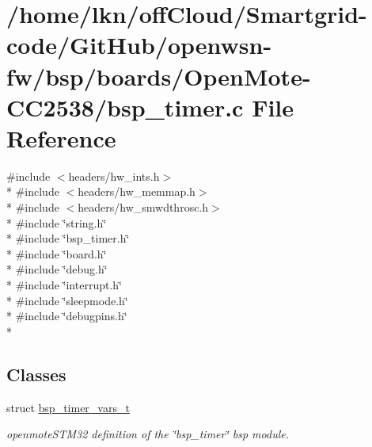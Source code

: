 \hypertarget{_open_mote-_c_c2538_2bsp__timer_8c}{}\section{/home/lkn/off\+Cloud/\+Smartgrid-\/code/\+Git\+Hub/openwsn-\/fw/bsp/boards/\+Open\+Mote-\/\+C\+C2538/bsp\+\_\+timer.c File Reference}
\label{_open_mote-_c_c2538_2bsp__timer_8c}
{\ttfamily \#include $<$headers/hw\+\_\+ints.\+h$>$}\\*
{\ttfamily \#include $<$headers/hw\+\_\+memmap.\+h$>$}\\*
{\ttfamily \#include $<$headers/hw\+\_\+smwdthrosc.\+h$>$}\\*
{\ttfamily \#include \char`\"{}string.\+h\char`\"{}}\\*
{\ttfamily \#include \char`\"{}bsp\+\_\+timer.\+h\char`\"{}}\\*
{\ttfamily \#include \char`\"{}board.\+h\char`\"{}}\\*
{\ttfamily \#include \char`\"{}debug.\+h\char`\"{}}\\*
{\ttfamily \#include \char`\"{}interrupt.\+h\char`\"{}}\\*
{\ttfamily \#include \char`\"{}sleepmode.\+h\char`\"{}}\\*
{\ttfamily \#include \char`\"{}debugpins.\+h\char`\"{}}\\*
\subsection*{Classes}
\begin{DoxyCompactItemize}
\item 
struct \hyperlink{structbsp__timer__vars__t}{bsp\+\_\+timer\+\_\+vars\+\_\+t}
\begin{DoxyCompactList}\small\item\em openmote\+S\+T\+M32 definition of the \char`\"{}bsp\+\_\+timer\char`\"{} bsp module. \end{DoxyCompactList}\end{DoxyCompactItemize}

